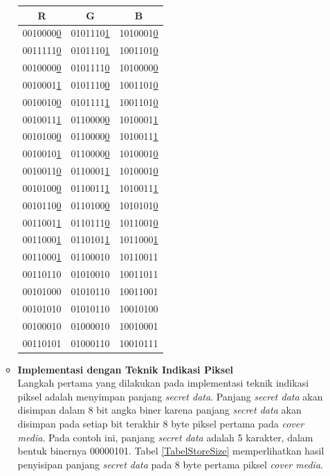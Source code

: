 \documentclass[a4paper,twoside]{article}
\begin{document}
\begin{enumerate}
\begin{itemize}
\begin{table}[!htbp]
		\begin{tabular}{| c | c | c |}
		\hline
		R & G & B\\
		\hline
		0010000\underline{0} & 0101110\underline{1} & 1010001\underline{0}\\
		\hline
		0011111\underline{0} & 0101110\underline{1} & 1001101\underline{0}\\
		\hline
		0010000\underline{0} & 0101111\underline{0} & 1010000\underline{0}\\
		\hline
		0010001\underline{1} & 0101110\underline{0} & 1001101\underline{0}\\
		\hline
		0010010\underline{0} & 0101111\underline{1} & 1001101\underline{0}\\
		\hline
		0010011\underline{1} & 0110000\underline{0} & 1010001\underline{1}\\
		\hline
		0010100\underline{0} & 0110000\underline{0} & 1010011\underline{1}\\
		\hline
		0010010\underline{1} & 0110000\underline{0} & 1010001\underline{0}\\
		\hline
		0010011\underline{0} & 0110001\underline{1} & 1010001\underline{0}\\
		\hline
		0010100\underline{0} & 0110011\underline{1} & 1010011\underline{1}\\
		\hline
		0010110\underline{0} & 0110100\underline{0} & 1010101\underline{0}\\
		\hline
		0011001\underline{1} & 0110111\underline{0} & 1011001\underline{0}\\
		\hline
		0011000\underline{1} & 0110101\underline{1} & 1011000\underline{1}\\
		\hline
		0011000\underline{1} & 01100010 & 10110011\\
		\hline
		00110110 & 01010010 & 10011011\\
		\hline
		00101000 & 01010110 & 10011001\\
		\hline
		00101010 & 01010110 & 10010100\\
		\hline
		00100010 & 01000010 & 10010001\\
		\hline
		00110101 & 01000110 & 10010111\\
		\hline
		\end{tabular}		
		\end{table}
		
		\item \textbf{Implementasi dengan Teknik Indikasi Piksel}\\
		Langkah pertama yang dilakukan pada implementasi teknik indikasi piksel adalah menyimpan panjang \textit{secret data}. Panjang \textit{secret data} akan disimpan dalam 8 bit angka biner karena panjang \textit{secret data} akan disimpan pada setiap bit terakhir 8 byte piksel pertama pada \textit{cover media}. Pada contoh ini, panjang \textit{secret data} adalah 5 karakter, dalam bentuk binernya 00000101. Tabel \ref{TabelStoreSize} memperlihatkan hasil penyisipan panjang \textit{secret data} pada 8 byte pertama piksel \textit{cover media}.\\
		

\end{itemize}
\end{enumerate}
\end{document}
